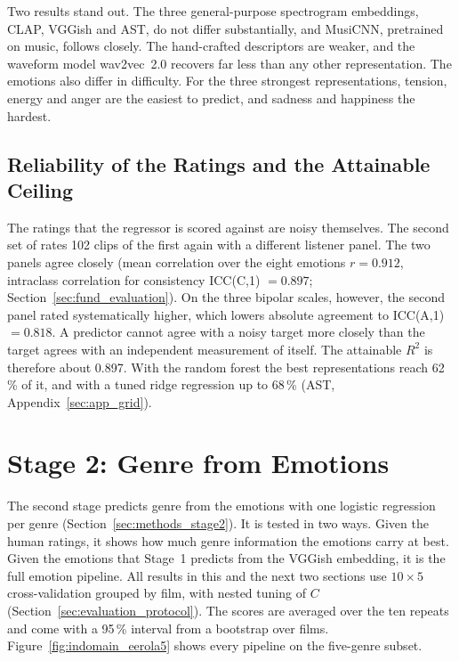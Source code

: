 Two results stand out. The three general-purpose spectrogram embeddings, CLAP, VGGish and
AST, do not differ substantially, and MusiCNN, pretrained on music, follows closely. The
hand-crafted descriptors are weaker, and the waveform model wav2vec~2.0 recovers far less
than any other representation. The emotions also differ in difficulty. For the three
strongest representations, tension, energy and anger are the easiest to predict, and sadness
and happiness the hardest.

\subsection{Reliability of the Ratings and the Attainable Ceiling}
\label{subsec:rating_reliability}

The ratings that the regressor is scored against are noisy themselves. The second set of
\citet{eerola2011comparison} rates 102 clips of the first again with a different listener
panel. The two panels agree closely (mean correlation over the eight emotions $r=0.912$,
intraclass correlation for consistency ICC(C,1) $=0.897$; Section~\ref{sec:fund_evaluation}). On the three bipolar scales,
however, the second panel rated systematically higher, which lowers absolute agreement to
ICC(A,1) $=0.818$. A predictor cannot agree with a noisy target more closely than the target
agrees with an independent measurement of itself. The attainable $R^2$ is therefore about
0.897. With the random forest the best representations reach 62\,\% of it, and with a tuned
ridge regression up to 68\,\% (AST, Appendix~\ref{sec:app_grid}).

\section{Stage 2: Genre from Emotions}
\label{sec:eval_genre}

The second stage predicts genre from the emotions with one logistic regression per genre
(Section~\ref{sec:methods_stage2}). It is tested in two ways. Given the human ratings, it
shows how much genre information the emotions carry at best. Given the emotions that
Stage~1 predicts from the VGGish embedding, it is the full emotion pipeline. All results in
this and the next two sections use $10\times5$ cross-validation grouped by film, with
nested tuning of $C$ (Section~\ref{sec:evaluation_protocol}). The scores are averaged over
the ten repeats and come with a 95\,\% interval from a bootstrap over films.
Figure~\ref{fig:indomain_eerola5} shows every pipeline on the five-genre subset.

